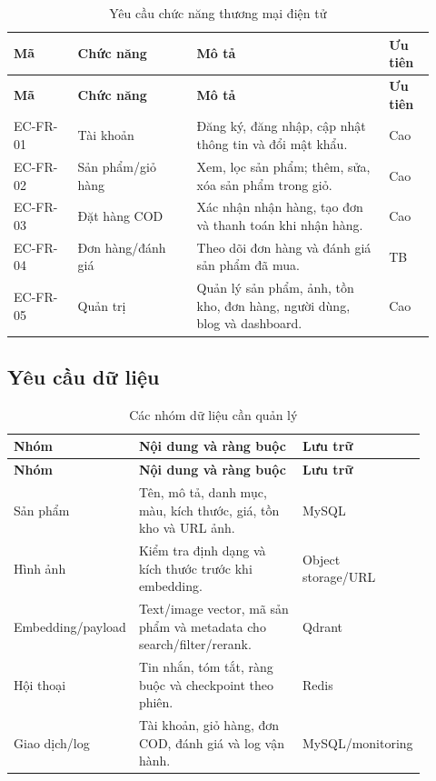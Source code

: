 \begin{longtable}{|p{0.14\linewidth}|p{0.26\linewidth}|p{0.42\linewidth}|p{0.10\linewidth}|}
\caption{Yêu cầu chức năng thương mại điện tử}\label{tab:ecommerce-functional-requirements}\\
\hline
\textbf{Mã} & \textbf{Chức năng} & \textbf{Mô tả} & \textbf{Ưu tiên} \\
\hline
\endfirsthead
\hline
\textbf{Mã} & \textbf{Chức năng} & \textbf{Mô tả} & \textbf{Ưu tiên} \\
\hline
\endhead
EC-FR-01 & Tài khoản & Đăng ký, đăng nhập, cập nhật thông tin và đổi mật khẩu. & Cao \\
\hline
EC-FR-02 & Sản phẩm/giỏ hàng & Xem, lọc sản phẩm; thêm, sửa, xóa sản phẩm trong giỏ. & Cao \\
\hline
EC-FR-03 & Đặt hàng COD & Xác nhận nhận hàng, tạo đơn và thanh toán khi nhận hàng. & Cao \\
\hline
EC-FR-04 & Đơn hàng/đánh giá & Theo dõi đơn hàng và đánh giá sản phẩm đã mua. & TB \\
\hline
EC-FR-05 & Quản trị & Quản lý sản phẩm, ảnh, tồn kho, đơn hàng, người dùng, blog và dashboard. & Cao \\
\hline
\end{longtable}

\subsection{Yêu cầu dữ liệu}

\begin{longtable}{|p{0.22\linewidth}|p{0.52\linewidth}|p{0.16\linewidth}|}
\caption{Các nhóm dữ liệu cần quản lý}\label{tab:data-requirements}\\
\hline
\textbf{Nhóm} & \textbf{Nội dung và ràng buộc} & \textbf{Lưu trữ} \\
\hline
\endfirsthead
\hline
\textbf{Nhóm} & \textbf{Nội dung và ràng buộc} & \textbf{Lưu trữ} \\
\hline
\endhead
Sản phẩm & Tên, mô tả, danh mục, màu, kích thước, giá, tồn kho và URL ảnh. & MySQL \\
\hline
Hình ảnh & Kiểm tra định dạng và kích thước trước khi embedding. & Object storage/URL \\
\hline
Embedding/payload & Text/image vector, mã sản phẩm và metadata cho search/filter/rerank. & Qdrant \\
\hline
Hội thoại & Tin nhắn, tóm tắt, ràng buộc và checkpoint theo phiên. & Redis \\
\hline
Giao dịch/log & Tài khoản, giỏ hàng, đơn COD, đánh giá và log vận hành. & MySQL/monitoring \\
\hline
\end{longtable}

